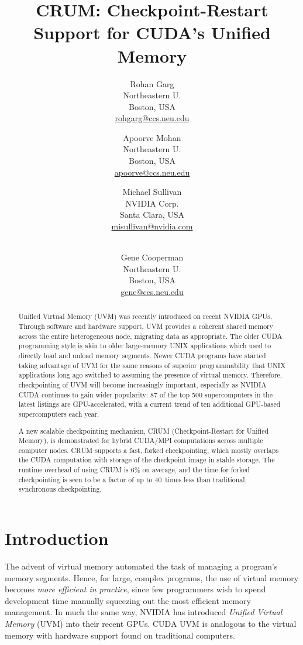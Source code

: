 \documentclass[11pt]{article}
\title{\textbf{\Large CRUM: Checkpoint-Restart Support for CUDA's Unified Memory}}
\date{}
\author{Rohan Garg \\
        Northeastern U. \\
        Boston, USA \\
        \url{rohgarg@ccs.neu.edu}
        \and
        Apoorve Mohan  \\
        Northeastern U. \\
        Boston, USA \\
        \url{apoorve@ccs.neu.edu}
        \and
        Michael Sullivan \\
        NVIDIA Corp. \\
        Santa Clara, USA \\
        \url{misullivan@nvidia.com}
        \and
        \\
        Gene Cooperman \\
        Northeastern U. \\
        Boston, USA \\
        \url{gene@ccs.neu.edu}}
\begin{document}
\maketitle
\begin{abstract}

Unified Virtual Memory (UVM) was recently introduced on recent NVIDIA GPUs.
Through software and hardware support, UVM provides a
coherent shared memory across the entire heterogeneous node, migrating data as
appropriate. The older CUDA programming style is akin to older large-memory
UNIX applications which used to directly load and unload memory segments. Newer
CUDA programs have started taking advantage of UVM for the same reasons of
superior programmability that UNIX applications long ago switched to assuming
the presence of virtual memory.  Therefore, checkpointing of UVM will become
increasingly important, especially as NVIDIA CUDA continues to gain wider
popularity: 87 of the top 500 supercomputers in the latest listings are
GPU-accelerated, with a current trend of ten additional GPU-based
supercomputers each year.

A new scalable checkpointing mechanism, CRUM (Checkpoint-Restart for
Unified Memory), is demonstrated for hybrid CUDA/MPI computations across
multiple computer nodes. CRUM supports a fast, forked checkpointing,
which mostly overlaps the CUDA computation with storage of the checkpoint
image in stable storage. The runtime overhead of using CRUM is 6\% on
average, and the time for forked checkpointing is seen to be a factor
of up to 40~times less than traditional, synchronous checkpointing.


\end{abstract}





\section{Introduction}


The advent of virtual memory automated the task of managing a program's memory
segments. Hence, for large, complex programs, the use of virtual memory becomes
{\em more efficient in practice}, since few programmers wish to spend
development time manually squeezing out the most efficient memory management.
In much the same way, NVIDIA has introduced {\em Unified Virtual Memory} (UVM)
into their recent GPUs.  CUDA UVM is analogous to the
virtual memory with hardware support found on traditional computers.
\end{document}

